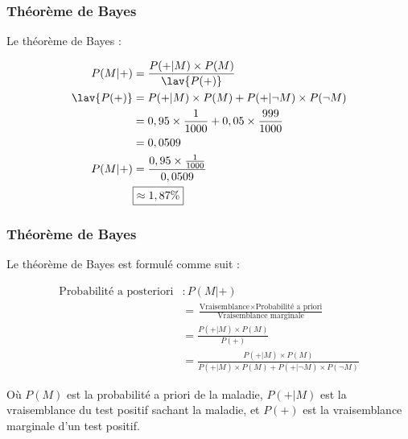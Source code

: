 \documentclass[xcolor=dvipsnames, onlymath, 10pt, aspectratio=169, handout]{beamer}
\begin{document}

\begin{frame}
	\frametitle{Théorème de Bayes}

	Le théorème de Bayes :

	\begin{align*}
		P(M|+)     & = \frac{P(+|M) \times P(M)}{\lav{P(+)}}                     \\
		\lav{P(+)} & = P(+|M) \times P(M) + P(+|\neg M) \times P(\neg M)         \\
		           & = 0,95 \times \frac{1}{1000} + 0,05 \times \frac{999}{1000} \\
		           & = 0,0509                                                    \\
		P(M|+)     & = \frac{0,95 \times \frac{1}{1000}}{0,0509}                 \\
		           & \boxed{\approx 1,87\%}
	\end{align*}

	\vfill
	\vfill



\end{frame}



\begin{frame}
	\frametitle{Théorème de Bayes}

	Le théorème de Bayes est formulé comme suit :

	\begin{align*}
		\text{Probabilité a posteriori} & : P(M|+)                                                                                         \\
		                                & = \frac{\text{Vraisemblance} \times \text{Probabilité a priori}}{\text{Vraisemblance marginale}} \\
		                                & = \frac{P(+|M) \times P(M)}{P(+)}                                                                \\
		                                & = \frac{P(+|M) \times P(M)}{P(+|M) \times P(M) + P(+|\neg M) \times P(\neg M)}
	\end{align*}

	Où \( P(M) \) est la probabilité a priori de la maladie, \( P(+|M) \) est la vraisemblance du test positif sachant la maladie, et \( P(+) \) est la vraisemblance marginale d'un test positif.


	\vfill
	\vfill



\end{frame}

\end{document}

